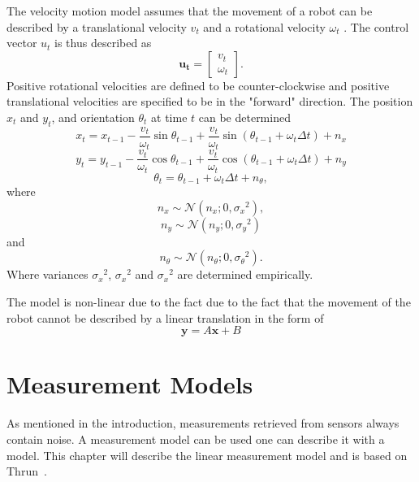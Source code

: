 \documentclass[12pt,oneside,openany,a4paper, %
afrikaans,english,
]{memoir}
\numberwithin{equation}{chapter}
\begin{document}
The velocity motion model assumes that the movement of a robot can be described by a translational velocity $v_t$ and a rotational velocity $\omega_t$ . The control vector $u_t$ is thus described as
\begin{equation}
\bm{u_t} = 
\begin{bmatrix}
v_t\\
\omega_t
\end{bmatrix}.
\end{equation}
Positive rotational velocities are defined to be counter-clockwise and positive translational velocities are specified to be in the "forward" direction.
The position $x_t$ and $y_t$, and orientation $\theta_t$ at time $t$ can be determined
\begin{equation}
x_t = x_{t-1} - \frac{v_t}{\omega_t} \sin\theta_{t-1} + \frac{v_t}{\omega_t} \sin(\theta_{t-1} + \omega_t \Delta t) + n_x
\end{equation}
\begin{equation}
y_t = y_{t-1} - \frac{v_t}{\omega_t} \cos\theta_{t-1} + \frac{v_t}{\omega_t} \cos(\theta_{t-1} + \omega_t \Delta t) + n_y
\end{equation}
\begin{equation}
\theta_t = \theta_{t-1} + \omega_t \Delta t + n_\theta,
\end{equation}
where
\begin{equation}
n_x \sim \mathcal{N}(n_x; 0, {\sigma_x}^2),
\end{equation}
\begin{equation}
n_y \sim \mathcal{N}(n_y; 0, {\sigma_y}^2)
\end{equation}
and
\begin{equation}
n_\theta \sim \mathcal{N}(n_\theta; 0, {\sigma_\theta}^2).
\end{equation}
Where variances ${\sigma_x}^2$, ${\sigma_x}^2$ and ${\sigma_x}^2$ are determined empirically.

The model is non-linear due to the fact due to the fact that the movement of the robot cannot be described by a linear translation in the form of
\begin{equation}
\bm{y} = A\bm{x} + B
\end{equation}
\chapter{Measurement Models}

As mentioned in the introduction, measurements retrieved from sensors always contain noise. A measurement model can be used one can describe it with a model. This chapter will describe the linear measurement model and is based on Thrun~\citep{thrun}.
\end{document}
